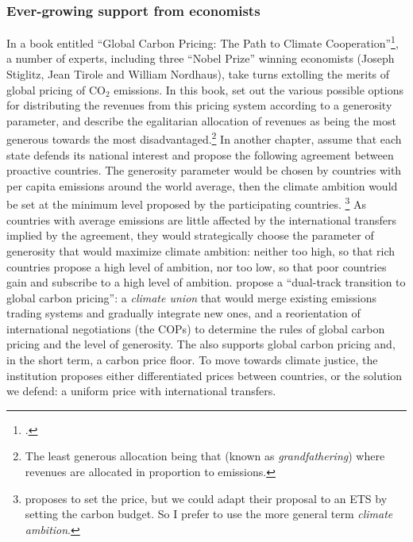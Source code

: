 \documentclass[a5paper,english,openany]{memoir}
\begin{document}
\subsubsection*{Ever-growing support from economists}
In a book entitled ``Global Carbon Pricing: The Path to Climate Cooperation''\footnote{\citet{cramton_global_2017}.}, a number of experts, including three ``Nobel Prize'' winning economists (Joseph Stiglitz, Jean Tirole and William Nordhaus), take turns extolling the merits of global pricing of CO$_\text{2}$ emissions. In this book, \citet{gollier_negotiating_2015} set out the various possible options for distributing the revenues from this pricing system according to a generosity parameter, and describe the egalitarian allocation of revenues as being the most generous towards the most disadvantaged.\footnote{The least generous allocation being that (known as \textit{grandfathering}) where revenues are allocated in proportion to emissions.} 
In another chapter, \citet{cramton_international_2015} assume that each state defends its national interest and propose the following agreement between proactive countries. %
The generosity parameter would be chosen by countries with per capita emissions around the world average, then the climate ambition would be set at the minimum level proposed by the participating countries. %
\footnote{\citet{cramton_international_2015} proposes to set the price, but we could adapt their proposal to an ETS by setting the carbon budget. So I prefer to use the more general term \textit{climate ambition}.} As countries with average emissions are little affected by the international transfers implied by the agreement, they would strategically choose the parameter of generosity that would maximize climate ambition: neither too high, so that rich countries propose a high level of ambition, nor too low, so that poor countries gain and subscribe to a high level of ambition. \citet{van_den_bergh_dual-track_2020} propose a ``dual-track transition to global carbon pricing'': a \textit{climate union} that would merge existing emissions trading systems and gradually integrate new ones, and a reorientation of international negotiations (the COPs) to determine the rules of global carbon pricing and the level of generosity. The \citet{imf_how_2019} also supports global carbon pricing and, in the short term, a carbon price floor. To move towards climate justice, the institution proposes either differentiated prices between countries, or the solution we defend: a uniform price with international transfers. 
\end{document}
